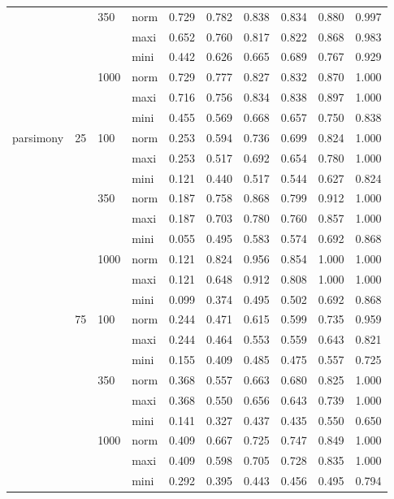 \begin{longtable}{llllrrrrrr}
   &  & 350 & norm & 0.729 & 0.782 & 0.838 & 0.834 & 0.880 & 0.997 \\ 
   &  &  & maxi & 0.652 & 0.760 & 0.817 & 0.822 & 0.868 & 0.983 \\ 
   &  &  & mini & 0.442 & 0.626 & 0.665 & 0.689 & 0.767 & 0.929 \\ 
   &  & 1000 & norm & 0.729 & 0.777 & 0.827 & 0.832 & 0.870 & 1.000 \\ 
   &  &  & maxi & 0.716 & 0.756 & 0.834 & 0.838 & 0.897 & 1.000 \\ 
   &  &  & mini & 0.455 & 0.569 & 0.668 & 0.657 & 0.750 & 0.838 \\ 
  parsimony & 25 & 100 & norm & 0.253 & 0.594 & 0.736 & 0.699 & 0.824 & 1.000 \\ 
   &  &  & maxi & 0.253 & 0.517 & 0.692 & 0.654 & 0.780 & 1.000 \\ 
   &  &  & mini & 0.121 & 0.440 & 0.517 & 0.544 & 0.627 & 0.824 \\ 
   &  & 350 & norm & 0.187 & 0.758 & 0.868 & 0.799 & 0.912 & 1.000 \\ 
   &  &  & maxi & 0.187 & 0.703 & 0.780 & 0.760 & 0.857 & 1.000 \\ 
   &  &  & mini & 0.055 & 0.495 & 0.583 & 0.574 & 0.692 & 0.868 \\ 
   &  & 1000 & norm & 0.121 & 0.824 & 0.956 & 0.854 & 1.000 & 1.000 \\ 
   &  &  & maxi & 0.121 & 0.648 & 0.912 & 0.808 & 1.000 & 1.000 \\ 
   &  &  & mini & 0.099 & 0.374 & 0.495 & 0.502 & 0.692 & 0.868 \\ 
   & 75 & 100 & norm & 0.244 & 0.471 & 0.615 & 0.599 & 0.735 & 0.959 \\ 
   &  &  & maxi & 0.244 & 0.464 & 0.553 & 0.559 & 0.643 & 0.821 \\ 
   &  &  & mini & 0.155 & 0.409 & 0.485 & 0.475 & 0.557 & 0.725 \\ 
   &  & 350 & norm & 0.368 & 0.557 & 0.663 & 0.680 & 0.825 & 1.000 \\ 
   &  &  & maxi & 0.368 & 0.550 & 0.656 & 0.643 & 0.739 & 1.000 \\ 
   &  &  & mini & 0.141 & 0.327 & 0.437 & 0.435 & 0.550 & 0.650 \\ 
   &  & 1000 & norm & 0.409 & 0.667 & 0.725 & 0.747 & 0.849 & 1.000 \\ 
   &  &  & maxi & 0.409 & 0.598 & 0.705 & 0.728 & 0.835 & 1.000 \\ 
   &  &  & mini & 0.292 & 0.395 & 0.443 & 0.456 & 0.495 & 0.794 \\ 

\end{longtable}
